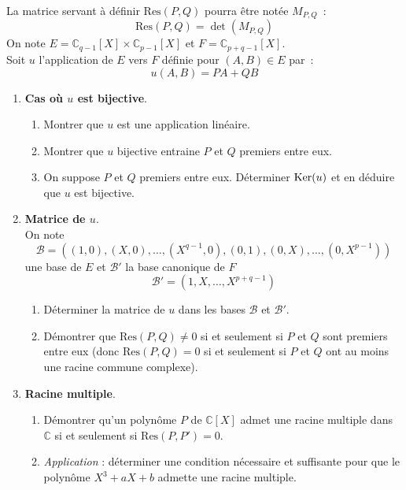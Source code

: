 La matrice servant à définir $\text{Res}(P,Q)$ pourra être notée $M_{P,Q}$~:
\[ \text{Res}(P,Q) = \det(M_{P,Q}) \]
On note $E=\mathbb{C}_{q-1}[X] \times \mathbb{C}_{p-1}[X]$ et $F=\mathbb{C}_{p+q-1}[X]$. \\
Soit $u$ l'application de $E$ vers $F$ définie pour $(A,B) \in E$ par~:
\[ u(A,B) = PA+QB \]
\begin{enumerate}
\item \textbf{Cas où $u$ est bijective}.
\begin{enumerate}
\item Montrer que $u$ est une application linéaire.
\item Montrer que $u$ bijective entraine $P$ et $Q$ premiers entre eux.
\item On suppose $P$ et $Q$ premiers entre eux. Déterminer $\operatorname{Ker}(u)$ et en déduire que $u$ est bijective.
\end{enumerate}
\item \textbf{Matrice de $u$}. \\
On note
\begin{displaymath}
 \mathcal{B}=((1,0),(X,0),\ldots,(X^{q-1},0),(0,1),(0,X),\ldots,(0,X^{p-1}))
\end{displaymath}
 une base de $E$ et $\mathcal{B}'$ la base canonique de $F$
\begin{displaymath}
 \mathcal{B}'=(1,X,\ldots,X^{p+q-1})
\end{displaymath}

\begin{enumerate}
\item Déterminer la matrice de $u$ dans les bases $\mathcal{B}$ et $\mathcal{B}'$.
\item Démontrer que $\text{Res}(P,Q) \neq 0$ si et seulement si $P$ et $Q$ sont premiers entre eux (donc $\text{Res}(P,Q)=0$ si et seulement si $P$ et $Q$ ont au moins une racine commune complexe).
    \end{enumerate}
\item \textbf{Racine multiple}.
\begin{enumerate}
\item Démontrer qu'un polynôme $P$ de $\mathbb{C}[X]$ admet une racine multiple dans $\mathbb{C}$ si et seulement si $\text{Res}(P,P')=0$.
\item \emph{Application} : déterminer une condition nécessaire et suffisante pour que le polynôme $X^3+aX+b$ admette une racine multiple.
\end{enumerate}
\end{enumerate}

